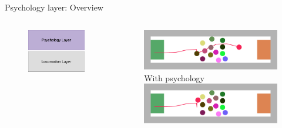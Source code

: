 \documentclass[compress,t,usenames,xcolor=dvipsnames]{beamer}
\begin{document}
\begin{frame}[c]{Psychology layer: Overview}
    
    \begin{columns}
        \begin{column}[c]{0.5\linewidth}
            \begin{figure}
                \centering
                \includegraphics[width=\linewidth]{VaderePsychologyLayer/StepByStep/Vadere-PsychologyLayerSimple}
            \end{figure}
        \end{column}
        \begin{column}[c]{0.5\linewidth}
            \begin{figure}
                \centering
                \includegraphics[width=\linewidth]{VaderePsychologyLayer/DisabledVsEnabled/CooperativeCognitionModel-PsychEnabled}
                \newline
                {\footnotesize With psychology \href{run:./Videos/Validation-UseCase1-CooperativeCognitionModel-Enabled.mp4}{\faPlayCircleO}}
                \includegraphics[width=\linewidth]{VaderePsychologyLayer/DisabledVsEnabled/CooperativeCognitionModel-PsychDisabled}

\end{figure}
\end{column}
\end{columns}
\end{frame}
\end{document}
